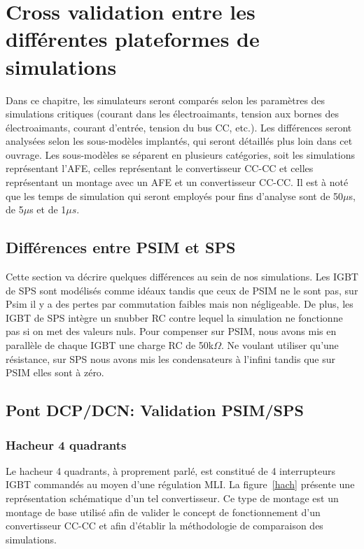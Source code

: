 \documentclass[11pt,letterpaper,final]{report}
\begin{document}
\chapter{Cross validation entre les différentes plateformes de simulations}
Dans ce chapitre, les simulateurs seront comparés selon les paramètres des simulations critiques (courant dans les électroaimants, tension aux bornes des électroaimants, courant d'entrée, tension du bus CC, etc.). Les différences seront analysées selon les sous-modèles implantés, qui seront détaillés plus loin dans cet ouvrage. Les sous-modèles se séparent en plusieurs catégories, soit les simulations représentant l'AFE, celles représentant le convertisseur CC-CC et celles représentant un montage avec un AFE et un convertisseur CC-CC. Il est à noté que les temps de simulation qui seront employés pour fins d'analyse sont de 50$\mu$s, de 5$\mu$s et de 1$\mu s$. 

\section{Différences entre PSIM et SPS}
Cette section va décrire quelques différences au sein de nos 
simulations. Les IGBT de SPS sont modélisés comme idéaux tandis que ceux de PSIM ne le sont pas, sur Psim il y a des pertes par commutation faibles mais non négligeable. De plus, les IGBT de SPS intègre un snubber RC contre lequel la simulation ne fonctionne pas si on met des valeurs nuls. Pour compenser sur PSIM, nous avons mis en parallèle de chaque IGBT une charge RC de  50k$\Omega$. Ne voulant utiliser qu'une résistance, sur SPS nous avons mis les condensateurs à l'infini tandis que sur PSIM elles sont à zéro.
\section{Pont DCP/DCN: Validation PSIM/SPS}
\subsection{Hacheur 4 quadrants}
Le hacheur 4 quadrants, à proprement parlé, est constitué de 4 interrupteurs IGBT commandés au moyen d'une régulation MLI. La figure~\ref{hach} présente une représentation schématique d'un tel convertisseur. Ce type de montage est un montage de base utilisé afin de valider le concept de fonctionnement d'un convertisseur CC-CC et afin d'établir la méthodologie de comparaison des simulations.
\end{document}
